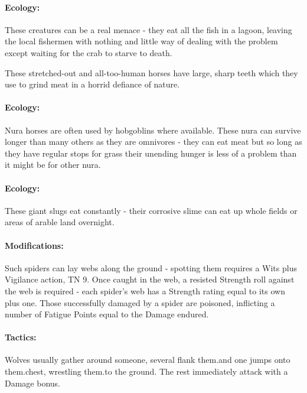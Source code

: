 \begin{multicols}{2}
\paragraph{Ecology:} These creatures can be a real menace - they eat all the fish in a lagoon, leaving the local fishermen with nothing and little way of dealing with the problem except waiting for the crab to starve to death.

\nuracrab

\label{nura_horse}
\nurahorse

These stretched-out and all-too-human horses have large, sharp teeth which they use to grind meat in a horrid defiance of nature.

\paragraph{Ecology:} Nura horses are often used by hobgoblins where available.  These nura can survive longer than many others as they are omnivores - they can eat meat but so long as they have regular stops for grass their unending hunger is less of a problem than it might be for other nura.

\label{nura_slug}
\paragraph{Ecology:} These giant slugs eat constantly - their corrosive slime can eat up whole fields or areas of arable land overnight.

\nuraslug

\label{nura_spider}

\nuraspider

\paragraph{Modifications:} Such spiders can lay webs along the ground - spotting them requires a Wits plus Vigilance action, TN 9.
Once caught in the web, a resisted Strength roll against the web is required - each spider's web has a Strength rating equal to its own plus one.  Those successfully damaged by a spider are poisoned, inflicting a number of Fatigue Points equal to the Damage endured.

\label{nura_wolf}

\paragraph{Tactics:} Wolves usually gather around someone, several flank them.and one jumps onto them.chest, wrestling them.to the ground.  The rest immediately attack with a Damage bonus.


\end{multicols}
